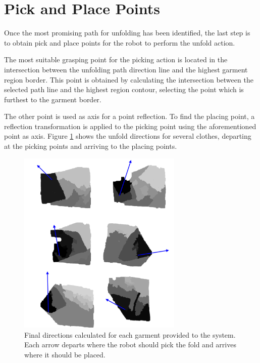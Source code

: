 \section{Pick and Place Points}
\label{pick_and_place}
Once the most promising path for unfolding has been identified, the last step is to obtain pick and place points for the robot to perform the unfold action.

The most suitable grasping point for the picking action is located in the  intersection between the unfolding path direction line and the highest garment region border. This point is obtained by calculating the intersection between the selected path line and the highest region contour, selecting the point which is furthest to the garment border.

The other point is used as axis for a point reflection. To find the placing point, a reflection transformation is applied to the picking point using the aforementioned point as axis. Figure \ref{fig:directions} shows the unfold directions for several clothes, departing at the picking points and arriving to the placing points.

\begin{figure}[thpb]
    \centering
    \includegraphics[width=0.7\textwidth]{figures/directions.pdf}
    \caption{Final directions calculated for each garment provided to the system. Each arrow departs where the robot should pick the fold and arrives where it should be placed.}
    \label{fig:directions}
\end{figure}



